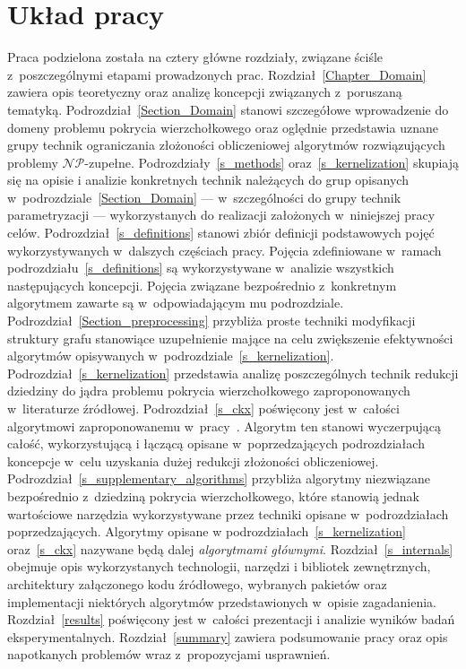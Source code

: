 \section{Układ pracy}\label{Section_Layout}
\par{
  Praca podzielona została na cztery główne rozdziały, związane ściśle z~poszczególnymi etapami prowadzonych prac.
  Rozdział~\ref{Chapter_Domain} zawiera opis teoretyczny oraz analizę koncepcji związanych z~poruszaną tematyką.
  Podrozdział~\ref{Section_Domain} stanowi szczegółowe wprowadzenie do domeny problemu pokrycia wierzchołkowego oraz oględnie przedstawia uznane grupy technik ograniczania złożoności obliczeniowej algorytmów rozwiązujących problemy $\mathcal{NP}$-zupełne.
  Podrozdziały~\ref{s_methods} oraz~\ref{s_kernelization} skupiają się na opisie i analizie konkretnych technik należących do grup opisanych w~podrozdziale~\ref{Section_Domain} --- w~szczególności do grupy technik parametryzacji --- wykorzystanych do realizacji założonych w~niniejszej pracy celów.
  Podrozdział~\ref{s_definitions} stanowi zbiór definicji podstawowych pojęć wykorzystywanych w~dalszych częściach pracy.
  Pojęcia zdefiniowane w~ramach podrozdziału~\ref{s_definitions} są wykorzystywane w~analizie wszystkich następujących koncepcji.
  Pojęcia związane bezpośrednio z~konkretnym algorytmem zawarte są w~odpowiadającym mu podrozdziale.
  Podrozdział~\ref{Section_preprocessing} przybliża proste techniki modyfikacji struktury grafu stanowiące uzupełnienie mające na celu zwiększenie efektywności algorytmów opisywanych w~podrozdziale~\ref{s_kernelization}.
  Podrozdział~\ref{s_kernelization} przedstawia analizę poszczególnych technik redukcji dziedziny do jądra problemu pokrycia wierzchołkowego zaproponowanych w~literaturze źródłowej.
  Podrozdział~\ref{s_ckx} poświęcony jest w~całości algorytmowi zaproponowanemu w~pracy~\cite{ImprovedBounds10}.
  Algorytm ten stanowi wyczerpującą całość, wykorzystującą i łączącą opisane w~poprzedzających podrozdziałach koncepcje w~celu uzyskania dużej redukcji złożoności obliczeniowej.
  Podrozdział~\ref{s_supplementary_algorithms} przybliża algorytmy niezwiązane bezpośrednio z~dziedziną pokrycia wierzchołkowego, które stanowią jednak wartościowe narzędzia wykorzystywane przez techniki opisane w~podrozdziałach poprzedzających.
  Algorytmy opisane w podrozdziałach~\ref{s_kernelization} oraz~\ref{s_ckx} nazywane będą dalej \emph{algorytmami głównymi}.
  Rozdział~\ref{s_internals} obejmuje opis wykorzystanych technologii, narzędzi i bibliotek zewnętrznych, architektury załączonego kodu źródłowego, wybranych pakietów oraz implementacji niektórych algorytmów przedstawionych w~opisie zagadanienia.
  Rozdział~\ref{results} poświęcony jest w~całości prezentacji i analizie wyników badań eksperymentalnych.
  Rozdział~\ref{summary} zawiera podsumowanie pracy oraz opis napotkanych problemów wraz z~propozycjami usprawnień.
}
